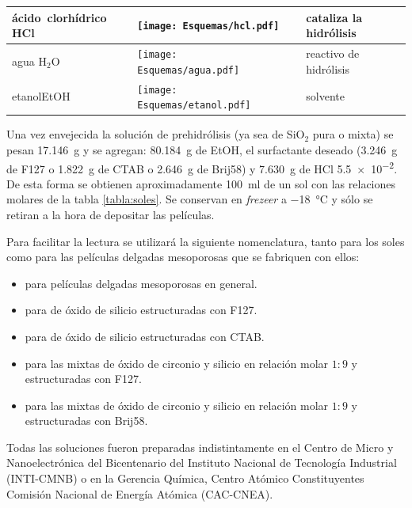 \begin{table}[ht!]
\begin{tabular}{>{\raggedright\arraybackslash}m{2.40cm}>{\centering\arraybackslash}m{4cm}>{\centering\arraybackslash}m{2.35cm}>{\raggedright\arraybackslash}m{1.7cm}}
				  		  \mbox{ácido clorhídrico} HCl& \texttt{[image: Esquemas/hcl.pdf]}  & \multirow{1}{*}{$36,46$}   & cataliza la hidrólisis \\ \midrule
				  		  agua \hspace{2cm} H$_2$O  &  \texttt{[image: Esquemas/agua.pdf]}  & \multirow{1}{*}{$18,02$}   & reactivo de hidrólisis \\ \midrule
				  		  etanol\hspace{0.75cm}EtOH  & \texttt{[image: Esquemas/etanol.pdf]}  & \multirow{1}{*}{$46,07$}   & solvente \\ 
				  		  \bottomrule
				    	  \end{tabular}
				   		  \label{tabla:reactivos}
					      \end{table}
			\vspace*{-0.6cm}			      
			Una vez envejecida la solución de prehidrólisis (ya sea de SiO$_2$ pura o mixta) se pesan  \SI{17.146}{\gram} y se agregan: \SI{80.184}{\gram} de EtOH, el surfactante deseado (\SI{3.246}{\gram} de F127 o \SI{1.822}{\gram} de CTAB o \SI{2.646}{\gram} de Brij58) y \SI{7.630}{\gram} de HCl \SI{5,5e-2}{\Molar}. De esta forma se obtienen aproximadamente \SI{100}{\ml} de un sol con las relaciones molares de la tabla \ref{tabla:soles}. Se conservan en \textit{frezeer} a \SI{-18}{\celsius} y sólo se retiran a la hora de depositar las películas. 

			Para facilitar la lectura se utilizará la siguiente nomenclatura, tanto para los soles como para las películas delgadas mesoporosas que se fabriquen con ellos: 

				\begin{itemize}
			     \item \pdm\space para películas delgadas mesoporosas en general.
			     \item \pdmF\space para \pdm\space de óxido de silicio estructuradas con F127. 
			     \item \pdmC\space para \pdm\space de óxido de silicio estructuradas con CTAB.
			     \item \pdmZ\space para las \pdm\space mixtas de óxido de circonio y silicio en relación molar $1\!:\!9$ y estructuradas con F127.
			     \item \pdmZB\space para las \pdm\space mixtas de óxido de circonio y silicio en relación molar $1\!:\!9$ y estructuradas con Brij58. 
      		     \end{itemize}	
			
			Todas las soluciones fueron preparadas indistintamente en el Centro de Micro y Nanoelectrónica del Bicentenario del Instituto Nacional de Tecnología Industrial (INTI-CMNB) o en la Gerencia Química, Centro Atómico Constituyentes Comisión Nacional de Energía Atómica (CAC-CNEA). 
					
